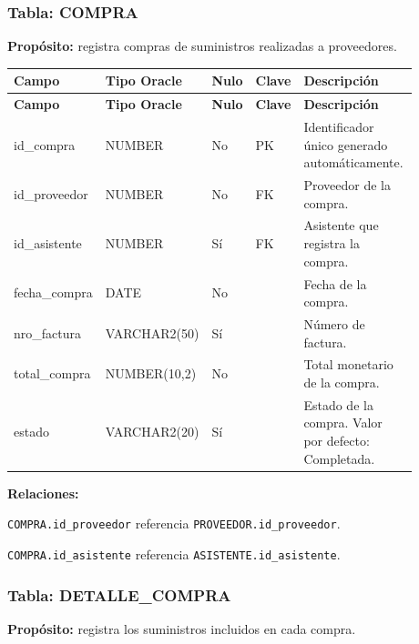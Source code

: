 \subsubsection{Tabla: COMPRA}

\textbf{Propósito:} registra compras de suministros realizadas a proveedores.\par

\begin{longtable}{p{0.18\linewidth}p{0.18\linewidth}p{0.08\linewidth}p{0.08\linewidth}p{0.36\linewidth}}
\toprule
\textbf{Campo} & \textbf{Tipo Oracle} & \textbf{Nulo} & \textbf{Clave} & \textbf{Descripción} \\
\midrule
\endfirsthead
\toprule
\textbf{Campo} & \textbf{Tipo Oracle} & \textbf{Nulo} & \textbf{Clave} & \textbf{Descripción} \\
\midrule
\endhead
id\_compra & NUMBER & No & PK & Identificador único generado automáticamente. \\
id\_proveedor & NUMBER & No & FK & Proveedor de la compra. \\
id\_asistente & NUMBER & Sí & FK & Asistente que registra la compra. \\
fecha\_compra & DATE & No &  & Fecha de la compra. \\
nro\_factura & VARCHAR2(50) & Sí &  & Número de factura. \\
total\_compra & NUMBER(10,2) & No &  & Total monetario de la compra. \\
estado & VARCHAR2(20) & Sí &  & Estado de la compra. Valor por defecto: Completada. \\
\bottomrule
\end{longtable}

\textbf{Relaciones:}\par
\texttt{COMPRA.id\_proveedor} referencia \texttt{PROVEEDOR.id\_proveedor}.\par
\texttt{COMPRA.id\_asistente} referencia \texttt{ASISTENTE.id\_asistente}.\par



\subsubsection{Tabla: DETALLE\_COMPRA}

\textbf{Propósito:} registra los suministros incluidos en cada compra.\par

